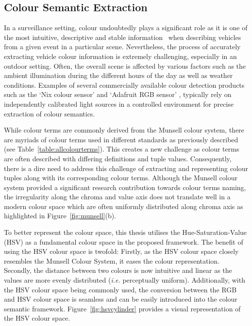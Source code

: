 \vspace{1em}
\subsection{Colour Semantic Extraction}
\label{subsec:colorsemantics}

In a surveillance setting, colour undoubtedly plays a significant role as it is one of the most intuitive, descriptive and stable information~\cite{zhang2017vehicle} when describing vehicles from a given event in a particular scene.
Nevertheless, the process of accurately extracting vehicle colour information is extremely challenging, especially in an outdoor setting. Often, the overall scene is affected by various factors such as the ambient illumination during the different hours of the day as well as weather conditions.
Examples of several commercially available colour detection products such as the `Nix colour sensor' \cite{nixsensorltd} and `Adafruit RGB sensor' \cite{adafruit}, typically rely on independently calibrated light sources in a controlled environment for precise extraction of colour semantics.

While colour terms are commonly derived from the Munsell colour system, there are myriads of colour terms used in different standards as previously described (see Table~\ref{table:allcolourterms}). %
This creates a new challenge as colour terms are often described with differing definitions and tuple values.
Consequently, there is a dire need to address this challenge of extracting and representing colour tuples along with its corresponding colour terms.
Although the Munsell colour system provided a significant research contribution towards colour terms naming, the irregularity along the chroma and value axis does not translate well in a modern colour space which are often uniformly distributed along chroma axis as highlighted in Figure~\ref{fig:munsell}(b).

To better represent the colour space, this thesis utilises the Hue-Saturation-Value (HSV) as a fundamental colour space in the proposed framework.
The benefit of using the HSV colour space is twofold: Firstly, as the HSV colour space closely resembles the Munsell Colour System, it eases the colour representation.
Secondly, the distance between two colours is now intuitive and linear as the values are more evenly distributed (\emph{i.e.} perceptually uniform).
Additionally, with the HSV colour space being commonly used, the conversion between the RGB and HSV colour space is seamless and can be easily introduced into the colour semantic framework. Figure~\ref{fig:hsvcylinder} provides a visual representation of the HSV colour space.

